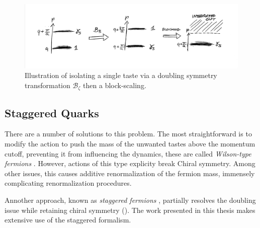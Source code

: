 \begin{figure}
  \vspace{-10pt}
  \begin{center}
    \includegraphics[width=
      1.0\textwidth]{images/blocking.jpg}
  \end{center}
  \vspace{-25pt}
  \caption{Illustration of isolating a single taste via a doubling symmetry transformation $\mathcal{B}_{\zeta}$ then a block-scaling.}
  \label{fig:tastemixing}
\end{figure}

\subsection{Staggered Quarks}

There are a number of solutions to this problem. The most straightforward is to modify the action to push the mass of the unwanted tastes above the momentum cutoff, preventing it from influencing the dynamics, these are called \textit{Wilson-type fermions} \cite{Wilson:1974sk}. However, actions of this type explicity break Chiral symmetry. Among other issues, this causes additive renormalization of the fermion mass, immensely complicating renormalization procedures.

Annother approach, known as \textit{staggered fermions} \cite{Kogut:1974ag}, partially resolves the doubling issue while retaining chiral symmetry ({}). The work presented in this thesis makes extensive use of the staggered formalism.

